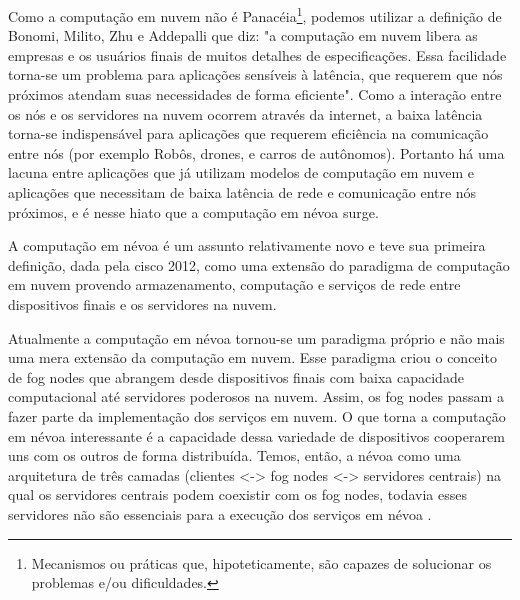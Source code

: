 Como a computação em nuvem não é Panacéia\footnote{Mecanismos ou práticas que, hipoteticamente, são capazes de solucionar os problemas e/ou dificuldades.}, podemos utilizar a definição de  Bonomi, Milito, Zhu e Addepalli\cite{Bonomi:2012} que diz: "a computação em nuvem libera as empresas e os usuários finais de muitos detalhes de especificações. Essa facilidade torna-se um problema para aplicações sensíveis à latência, que requerem que nós próximos atendam suas necessidades de forma eficiente". 
Como a interação entre os nós e os servidores na nuvem ocorrem através da internet, a baixa latência torna-se indispensável para aplicações que requerem eficiência na comunicação entre nós (por exemplo Robôs, drones, e carros de autônomos).
Portanto há uma lacuna entre aplicações que já utilizam modelos de computação em nuvem e aplicações que necessitam de baixa latência de rede e comunicação entre nós próximos, e é nesse hiato que a computação em névoa surge.

A computação em névoa é um assunto relativamente novo e teve sua primeira definição, dada pela cisco 2012, como uma extensão do paradigma de computação em nuvem provendo armazenamento, computação e serviços de rede entre dispositivos finais e os servidores na nuvem\cite{DBLP:journals/corr/RomanLM16}.

Atualmente a computação em névoa tornou-se um paradigma próprio e não mais uma mera extensão da computação em nuvem.
Esse paradigma criou o conceito de fog nodes que abrangem desde dispositivos finais com baixa capacidade computacional até servidores poderosos na nuvem. Assim, os fog nodes passam a fazer parte da implementação dos serviços em nuvem.
O que torna a computação em névoa interessante é a capacidade dessa variedade de dispositivos cooperarem uns com os outros de forma distribuída.
Temos, então, a névoa como uma arquitetura de três camadas (clientes <-> fog nodes <-> servidores centrais) na qual os servidores centrais podem coexistir com os fog nodes, todavia esses servidores não são essenciais para a execução dos serviços em névoa \cite{DBLP:journals/corr/RomanLM16}.

